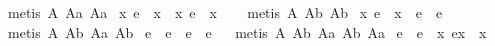 \begin{isabellebody}
%
\isadelimproof
%
\endisadelimproof
%
\isatagproof
{}\isamarkupfalse%
\ {\isacharparenleft}metis\ A{}\ A{}a\ A{}a{\isacharparenright}%
\endisatagproof
{\isafoldproof}%
%
\isadelimproof
\isanewline
%
\endisadelimproof
\isanewline
\isanewline
{}\isamarkupfalse%
\ {\isachardoublequoteopen}{\isacharparenleft}\isactrlbold {\isasymexists}x{\isachardot}\ e\ {\isasymapprox}\ {\isacharparenleft}{\isasymbox}x{\isacharparenright}{\isacharparenright}\ \isactrlbold {\isasymleftrightarrow}\ {\isacharparenleft}\isactrlbold {\isasymexists}x{\isachardot}\ e\ {\isasymapprox}\ {\isacharparenleft}x{\isasymbox}{\isacharparenright}{\isacharparenright}{\isachardoublequoteclose}\ \isanewline
%
\isadelimproof
\ %
\endisadelimproof
%
\isatagproof
{}\isamarkupfalse%
\ {\isacharparenleft}metis\ A{}\ A{}b\ A{}b{\isacharparenright}%
\endisatagproof
{\isafoldproof}%
%
\isadelimproof
\isanewline
%
\endisadelimproof
{}\isamarkupfalse%
\ {\isachardoublequoteopen}{\isacharparenleft}\isactrlbold {\isasymexists}x{\isachardot}\ e\ {\isasymapprox}\ {\isacharparenleft}x{\isasymbox}{\isacharparenright}{\isacharparenright}\ \isactrlbold {\isasymleftrightarrow}\ e\ {\isasymapprox}\ {\isacharparenleft}{\isasymbox}e{\isacharparenright}{\isachardoublequoteclose}\isanewline
%
\isadelimproof
\ %
\endisadelimproof
%
\isatagproof
{}\isamarkupfalse%
\ {\isacharparenleft}metis\ A{}\ A{}b\ A{}a\ A{}b{\isacharparenright}%
\endisatagproof
{\isafoldproof}%
%
\isadelimproof
\isanewline
%
\endisadelimproof
{}\isamarkupfalse%
\ {\isachardoublequoteopen}e\ {\isasymapprox}\ {\isacharparenleft}{\isasymbox}e{\isacharparenright}\ \isactrlbold {\isasymleftrightarrow}\ e\ {\isasymapprox}\ {\isacharparenleft}e{\isasymbox}{\isacharparenright}{\isachardoublequoteclose}\isanewline
%
\isadelimproof
\ %
\endisadelimproof
%
\isatagproof
{}\isamarkupfalse%
\ {\isacharparenleft}metis\ A{}\ A{}b\ A{}a\ A{}b\ A{}a{\isacharparenright}%
\endisatagproof
{\isafoldproof}%
%
\isadelimproof
\isanewline
%
\endisadelimproof
{}\isamarkupfalse%
\ {\isachardoublequoteopen}e\ {\isasymapprox}\ {\isacharparenleft}e{\isasymbox}{\isacharparenright}\ \isactrlbold {\isasymleftrightarrow}\ {\isacharparenleft}\isactrlbold {\isasymforall}x{\isachardot}\ e{\isasymcdot}x\ {\isasymgreaterapprox}\ x{\isacharparenright}{\isachardoublequoteclose}\isanewline
%
\isadelimproof

\end{isabellebody}
